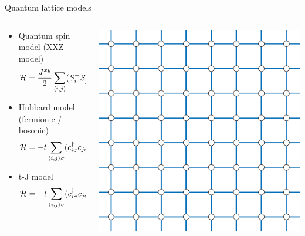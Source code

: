 \begin{frame}[fragile]{Quantum lattice models}
  \begin{columns}[T]
    \begin{column}{.8\textwidth}
      \begin{itemize}
        \setlength{\itemsep}{-.5em}
      \item Quantum spin model (XXZ model)
        \begin{equation*} {\cal H} = \frac{J^{xy}}{2}
          \sum_{\langle i,j \rangle} (S^+_i S^-_j + S^-_i S^+_j) + J^z
          \sum_{\langle i,j \rangle} S^z_i S^z_j
        \end{equation*}
      \item Hubbard model (fermionic / bosonic)
        \begin{equation*} {\cal H} = -t \sum_{\langle i,j \rangle \sigma}
          (c^\dagger_{i\sigma} c_{j\sigma} + \mbox{h.c.}) + U \sum_{i}
          n_{i\uparrow} n_{i\downarrow}
        \end{equation*}
      \item t-J model\begin{equation*} {\cal H} = -t \sum_{\langle i,j \rangle \sigma}
        (c^\dagger_{i\sigma} c_{j\sigma} + \mbox{h.c.}) + J \sum_{i,j}
        ({\bf S}_i \cdot {\bf S}_j - n_{i} n_{j} / 4) \end{equation*}
      \end{itemize}
    \end{column}
    \begin{column}{.2\textwidth}
      \includegraphics[width=\textwidth]{square.pdf}
    \end{column}
  \end{columns}
\end{frame}

